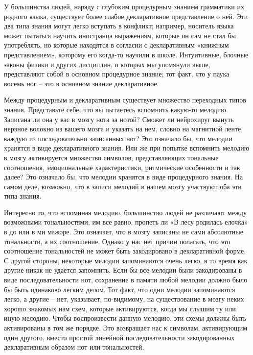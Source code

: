 \documentclass[../main.tex]{subfiles}
\begin{document}
У большинства людей, наряду с глубоким процедурным знанием грамматики их родного языка, существует более слабое декларативное представление о ней. Эти два типа знания могут легко вступать в конфликт; например, носитель языка может пытаться научить иностранца выражениям, которые он сам не стал бы употреблять, но которые находятся в согласии с декларативным «книжным представлением», которому его когда-то научили в школе. Интуитивные, блочные законы физики и других дисциплин, о которых мы упомянули выше, представляют собой в основном процедурное знание; тот факт, что у паука восемь ног \--- это в основном знание декларативное.

Между процедурным и декларативным существует множество переходных типов знания. Представьте себе, что вы пытаетесь вспомнить какую-то мелодию. Записана ли она у вас в мозгу нота за нотой? Сможет ли нейрохируг вынуть нервное волокно из вашего мозга и указать на нем, словно на магнитной ленте, каждую из последовательно записанных нот? Это означало бы, что мелодии хранятся в виде декларативного знания. Или же при попытке вспомнить мелодию в мозгу активируется множество символов, представляющих тональные соотношения, эмоциональные характеристики, ритмические особенности и так далее? Это означало бы, что мелодии хранятся в виде процедурного знания. На самом деле, возможно, что в записи мелодий в нашем мозгу участвуют оба эти типа знания.

Интересно то, что вспоминая мелодию, большинство людей не различают между возможными тональностями; им все равно, пропеть ли «В лесу родилась елочка» в до или в ми мажоре. Это означает, что в мозгу записаны не сами абсолютные тональности, а их соотношение. Однако у нас нет причин полагать, что это соотношение тональностей не может быть закодировано в декларативной форме. С другой стороны, некоторые мелодии запоминаются очень легко, в то время как другие никак не удается запомнить. Если бы все мелодии были закодированы в виде последовательности нот, сохранение в памяти любой мелодии должно было бы быть одинаково легким делом. Тот факт, что одни мелодии запоминаются легко, а другие \--- нет, указывает, по-видимому, на существование в мозгу неких хорошо знакомых нам схем, которые активируются, когда мы слышим ту или иную мелодию. Чтобы воспроизвести данную мелодию, эти схемы должны быть активированы в том же порядке. Это возвращает нас к символам, активирующим один другого, вместо простой линейной последовательности закодированных декларативным образом нот или тональностей.
\end{document}
